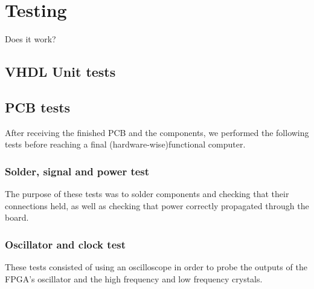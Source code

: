 \documentclass[../main/report.tex]{subfiles}
\begin{document}
\chapter{Testing}

Does it work?

\section{VHDL Unit tests}




\section{PCB tests}

After receiving the finished PCB and the components, we performed the following tests before reaching a final (hardware-wise)functional computer.   

\subsection{Solder, signal and power test}
The purpose of these tests was to solder components and checking that their connections held, as well as checking that power correctly propagated through the board.  


\subsection{Oscillator and clock test}
These tests consisted of using an oscilloscope in order to probe the outputs of the FPGA's oscillator and the high frequency and low frequency crystals.


%
\end{document}
